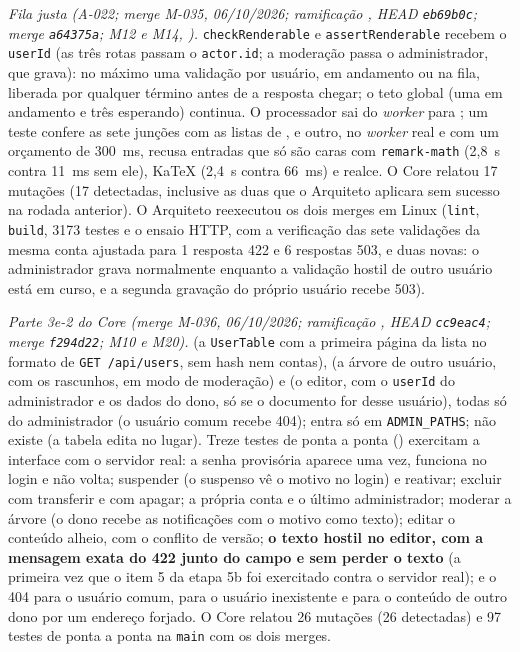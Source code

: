 \emph{Fila justa (A-022; merge M-035, 06/10/2026; ramificação , HEAD \texttt{eb69b0c}; merge \texttt{a64375a}; M12 e M14, ).} \texttt{checkRenderable} e \texttt{assertRenderable} recebem o \texttt{userId} (as três rotas passam o \texttt{actor.id}; a moderação passa o administrador, que grava): no máximo uma validação por usuário, em andamento ou na fila, liberada por qualquer término antes de a resposta chegar; o teto global (uma em andamento e três esperando) continua. O processador sai do \emph{worker} para ; um teste confere as sete junções com as listas de , e outro, no \emph{worker} real e com um orçamento de 300~ms, recusa entradas que só são caras com \texttt{remark-math} (2,8~s contra 11~ms sem ele), KaTeX (2,4~s contra 66~ms) e realce. O Core relatou 17 mutações (17 detectadas, inclusive as duas que o Arquiteto aplicara sem sucesso na rodada anterior). O Arquiteto reexecutou os dois merges em Linux (\texttt{lint}, \texttt{build}, 3173 testes e o ensaio HTTP, com a verificação das sete validações da mesma conta ajustada para 1 resposta 422 e 6 respostas 503, e duas novas: o administrador grava normalmente enquanto a validação hostil de outro usuário está em curso, e a segunda gravação do próprio usuário recebe 503).

\emph{Parte 3e-2 do Core (merge M-036, 06/10/2026; ramificação , HEAD \texttt{cc9eac4}; merge \texttt{f294d22}; M10 e M20).}  (a \texttt{UserTable} com a primeira página da lista no formato de \texttt{GET /api/users}, sem hash nem contas),  (a árvore de outro usuário, com os rascunhos, em modo de moderação) e  (o editor, com o \texttt{userId} do administrador e os dados do dono, só se o documento for desse usuário), todas só do administrador (o usuário comum recebe 404);  entra só em \texttt{ADMIN\_PATHS}; não existe  (a tabela edita no lugar). Treze testes de ponta a ponta () exercitam a interface com o servidor real: a senha provisória aparece uma vez, funciona no login e não volta; suspender (o suspenso vê o motivo no login) e reativar; excluir com transferir e com apagar; a própria conta e o último administrador; moderar a árvore (o dono recebe as notificações com o motivo como texto); editar o conteúdo alheio, com o conflito de versão; \textbf{o texto hostil no editor, com a mensagem exata do 422 junto do campo e sem perder o texto} (a primeira vez que o item 5 da etapa 5b foi exercitado contra o servidor real); e o 404 para o usuário comum, para o usuário inexistente e para o conteúdo de outro dono por um endereço forjado. O Core relatou 26 mutações (26 detectadas) e 97 testes de ponta a ponta na \texttt{main} com os dois merges.

